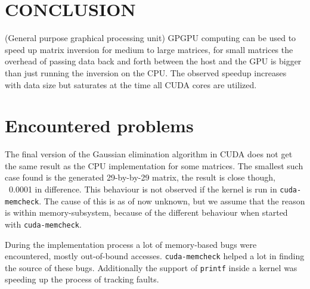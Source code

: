 
\section{CONCLUSION}
\label{sec:conclusion}

(General purpose graphical processing unit) GPGPU computing can be used to speed up matrix inversion for medium to large matrices, for small matrices the overhead of passing data back and forth between the host and the GPU is bigger than just running the inversion on the CPU. The observed speedup increases with data size but saturates at the time all CUDA cores are utilized. 

\section{Encountered problems}
The final version of the Gaussian elimination algorithm in CUDA does not get the same result as the CPU implementation for some matrices. The smallest such case found is the generated 29-by-by-29 matrix, the result is close though, ~0.0001 in difference. This behaviour is not observed if the kernel is run in \texttt{cuda-memcheck}. The cause of this is as of now unknown, but we assume that the reason is within memory-subsystem, because of the different behaviour when started with \texttt{cuda-memcheck}.

During the implementation process a lot of memory-based bugs were encountered, mostly out-of-bound accesses. \texttt{cuda-memcheck} helped a lot in finding the source of these bugs. Additionally the support of \texttt{printf} inside a kernel was speeding up the process of tracking faults.